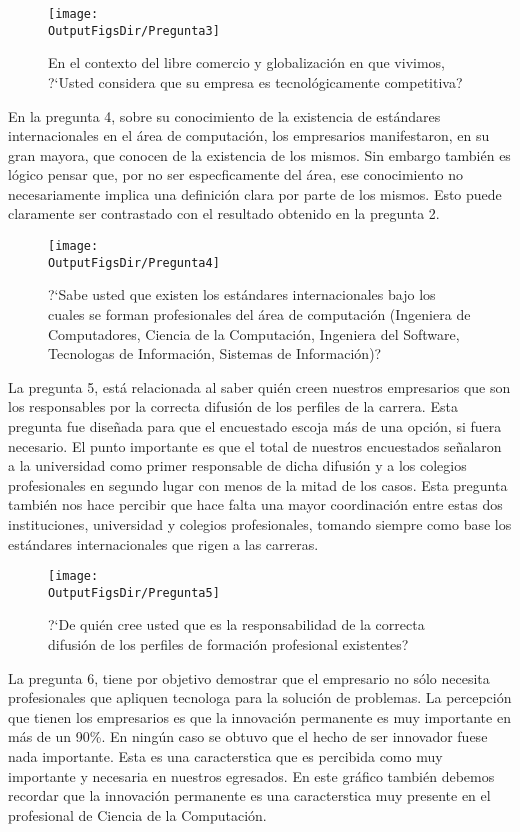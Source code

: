 \begin{figure}[!h]
	\centering
	\texttt{[image: \\OutputFigsDir/Pregunta3]}
	\label{fig:Preg3}
	\caption{En el contexto del libre comercio y globalización en que vivimos, ?`Usted considera que su empresa es tecnológicamente competitiva?}
\end{figure}

En la pregunta 4, sobre su conocimiento de la existencia de estándares internacionales en el área de computación, los empresarios manifestaron, en su gran mayor­a, que conocen de la existencia de los mismos. Sin embargo también es lógico pensar que, por no ser espec­ficamente del área, ese conocimiento no necesariamente implica una definición clara por parte de los mismos. Esto puede claramente ser contrastado con el resultado obtenido en la pregunta 2.


\begin{figure}[!h]
	\centering
	\texttt{[image: \\OutputFigsDir/Pregunta4]}
	\label{fig:Preg4}
	\caption{?`Sabe usted que existen los estándares internacionales bajo los cuales se forman profesionales del área de computación (Ingenier­a de Computadores, Ciencia de la Computación, Ingenier­a del Software, Tecnolog­as de Información, Sistemas de Información)?}
\end{figure}

La pregunta 5, está relacionada al saber quién creen nuestros empresarios que son los responsables por la correcta difusión de los perfiles de la carrera. Esta pregunta fue diseñada para que el encuestado escoja más de una opción, si fuera necesario. El punto importante es que el total de nuestros encuestados señalaron a la universidad como primer responsable de dicha difusión y a los colegios profesionales en segundo lugar con menos de la mitad de los casos. Esta pregunta también nos hace percibir que hace falta una mayor coordinación entre estas dos instituciones, universidad y colegios profesionales, tomando siempre como base los estándares internacionales que rigen a las carreras.

\begin{figure}[!h]
	\centering
	\texttt{[image: \\OutputFigsDir/Pregunta5]}
	\label{fig:Preg5}
	\caption{?`De quién cree usted que es la responsabilidad de la correcta difusión de los perfiles de formación profesional existentes?}
\end{figure}

La pregunta 6, tiene por objetivo demostrar que el empresario no sólo necesita profesionales que apliquen tecnolog­a para la solución de problemas. La percepción que tienen los empresarios es que la innovación permanente es muy importante en más de un 90\%. En ningún caso se obtuvo que el hecho de ser innovador fuese nada importante. Esta es una caracter­stica que es percibida como muy importante y necesaria en nuestros egresados. En este gráfico también debemos recordar que la innovación permanente es una caracter­stica muy presente en el profesional de Ciencia de la Computación.

